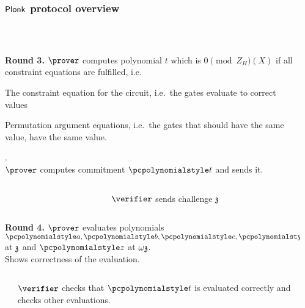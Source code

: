 \documentclass[aspectratio=169]{beamer}
\renewcommand{\myskip}{0.5\baselineskip}
\begin{document}
  \begin{frame}[t]
    \frametitle{$\textnormal{\textsf{Plonk}}$ protocol overview}
    \pause\\[\myskip]
  
  \begin{columns}
    \begin{column}{0.5\linewidth}
      \textbf{Round 3.} $\prover$ computes polynomial $t$ which is $0 \pmod
      Z_H(X)$ if all constraint equations are fulfilled, i.e.~
    \begin{compactitem}
    \item The constraint equation for the circuit, i.e.~the gates evaluate to
      correct values
    \item Permutation argument equations, i.e.~the gates that should have the
      same value, have the same value.
    \end{compactitem}
    .\\
    $\prover$ computes commitment $\p{t}$ and sends it.
  \end{column}
  \pause
  \begin{column}{0.5\linewidth}
  \end{column}
\end{columns}
\begin{columns}
  \begin{column}{0.5\linewidth}
  \end{column}
  \begin{column}{0.5\linewidth}
    $\verifier$ sends challenge $\mathfrak{z}$\pause
  \end{column}
\end{columns}
 \begin{columns}
    \begin{column}{0.5\linewidth}
      \textbf{Round 4.} $\prover$ evaluates polynomials $\p{a}, \p{b}, \p{c},
      \p{t}$ at $\mathfrak{z}$ and $\p{z}$ at $\omega \mathfrak{z}$.\\
      Shows correctness of the evaluation.\pause
    \end{column}
    \begin{column}{0.5\linewidth}
    \end{column}
  \end{columns}
  \begin{columns}
    \begin{column}{0.5\linewidth}
    \end{column}
    \begin{column}{0.5\linewidth}
      $\verifier$ checks that $\p{t}$ is evaluated correctly and checks other
      evaluations.
    \end{column}
  \end{columns}
\end{frame}
\end{document}
